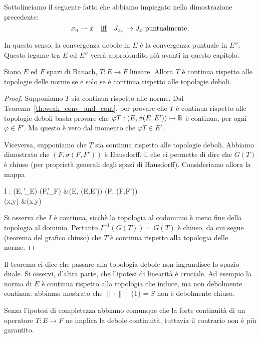 \begin{remark}
	Sottolineiamo il seguente fatto che abbiamo impiegato nella dimostrazione precedente:
	\begin{equation*}
		x_n \rightharpoonup x \quad\text{\underline{iff}}\quad J_{x_n} \underset{{}}{\rightarrow} J_x\ \text{puntualmente,}
	\end{equation*}
	In questo senso, la convergenza debole in $E$ è la convergenza puntuale in $E''$.
	Questo legame tra $E$ ed $E''$ verrà approfondito più avanti in questo capitolo.
\end{remark}

\begin{theorem}
	Siano $E$ ed $F$ spazi di Banach, $T : E \to F$ lineare. Allora $T$ è continua rispetto alle topologie delle norme se e solo se è continua rispetto alle topologie deboli.
\end{theorem}
\begin{proof}
	Supponiamo $T$ sia continua rispetto alle norme. Dal Teorema~\ref{th:weak_conv_and_cont}, per provare che $T$ è continua rispetto alle topologie deboli basta provare che $\varphi T : (E, \sigma(E,E')) \to \mathbb{R}$ è continua, per ogni $\varphi \in F'$. Ma questo è vero dal momento che $\varphi T \in E'$.

	Viceversa, supponiamo che $T$ sia continua rispetto alle topologie deboli. Abbiamo dimostrato che $(F, \sigma(F,F'))$ è Hausdorff, il che ci permette di dire che $G(T)$ è chiuso (per proprietà generali degli spazi di Hausdorff).
	Consideriamo allora la mappa
	\begin{eqalign*}
		I : (E, \|\cdot\|_E) \times (F,\|\cdot\|_F) &\longto (E, \sigma(E,E')) \times (F, \sigma(F,F'))\\
			(x,y) &\longmapsto (x,y)
	\end{eqalign*}
	Si osserva che $I$ è continua, sicchè la topologia al codominio è meno fine della topologia al dominio.
	Pertanto $I^{-1}(G(T)) = G(T)$ è chiuso, da cui segue (teorema del grafico chiuso) che $T$ è continua rispetto alla topologia delle norme.
\end{proof}

\begin{remark}
	Il teorema ci dice che passare alla topologia debole non ingrandisce lo spazio duale. Si osservi, d'altra parte, che l'ipotesi di linearità è cruciale. Ad esempio la norma di $E$ è continua rispetto alla topologia che induce, ma non debolmente continua: abbiamo mostrato che $\|\cdot\|^{-1}\{1\} = S$ non è debolmente chiuso.
\end{remark}
\begin{remark}
	Senza l'ipotesi di completezza abbiamo comunque che la forte continuità di un operatore $T:E \to F$ ne implica la debole continuità, tuttavia il contrario non è più garantito.
\end{remark}

